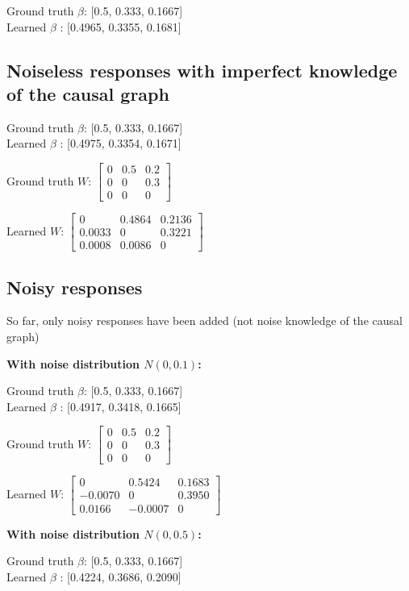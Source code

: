 Ground truth $\beta$: [0.5, 0.333, 0.1667] \\
Learned $\beta$ : [0.4965, 0.3355, 0.1681]

\subsection{Noiseless responses with imperfect knowledge of the causal graph}

Ground truth $\beta$: [0.5, 0.333, 0.1667] \\
Learned $\beta$ : [0.4975, 0.3354, 0.1671]

Ground truth $W$: $\begin{bmatrix}
	0 & 0.5 & 0.2 \\
	0 & 0 & 0.3 \\
	0 & 0 & 0
\end{bmatrix}$

Learned $W$: $\begin{bmatrix}
	0 & 0.4864 & 0.2136 \\
	0.0033 & 0 & 0.3221 \\
	0.0008 & 0.0086 & 0
\end{bmatrix}$



\subsection{Noisy responses}

So far, only noisy responses have been added (not noise knowledge of the causal graph)

\textbf{With noise distribution $N(0, 0.1)$:}

Ground truth $\beta$: [0.5, 0.333, 0.1667] \\
Learned $\beta$ : [0.4917, 0.3418, 0.1665]

Ground truth $W$: $\begin{bmatrix}
	0 & 0.5 & 0.2 \\
	0 & 0 & 0.3 \\
	0 & 0 & 0
\end{bmatrix}$

Learned $W$: $\begin{bmatrix}
	0 & 0.5424 & 0.1683 \\
	-0.0070 & 0 & 0.3950 \\
	0.0166 & -0.0007 & 0
\end{bmatrix}$


\textbf{With noise distribution $N(0, 0.5)$:}

Ground truth $\beta$: [0.5, 0.333, 0.1667] \\
Learned $\beta$ : [0.4224, 0.3686, 0.2090]

